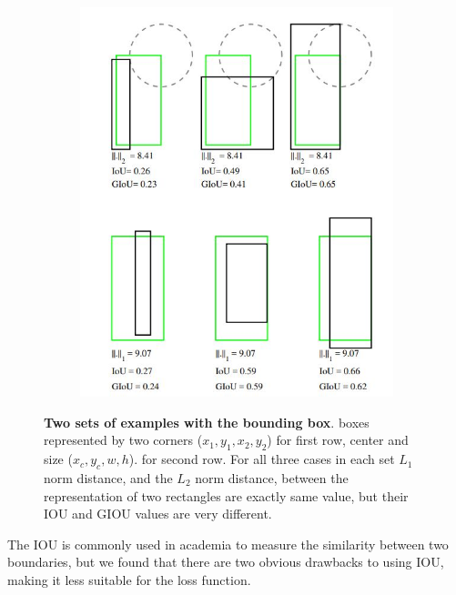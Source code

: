 \begin{figure}[h]
	\begin{center}
		\begin{subfigure}[b]{0.49\textwidth}
		    \centering
			\includegraphics[width=\textwidth]{thesis-template-master/images/l2loss.JPG}
			\label{fig:cellnet}
		\end{subfigure}
	\end{center}
	\caption{\textbf{Two sets of examples with the bounding box}.
boxes represented by two corners  ($x_{1}, y_{1}, x_{2}, y_{2}$)  for first row, center and size  ($x_{c}, y_{c}, w, h$). for second row. For all three cases in each set  $ L_{1}$ norm distance, and the $ L_{2}$ norm distance, between the representation of two rectangles are exactly same value, but their IOU and GIOU values are very different.}
\end{figure}

The IOU is commonly used in academia to measure the similarity between two boundaries, but we found that there are two obvious drawbacks to using IOU, making it less suitable for the loss function.

